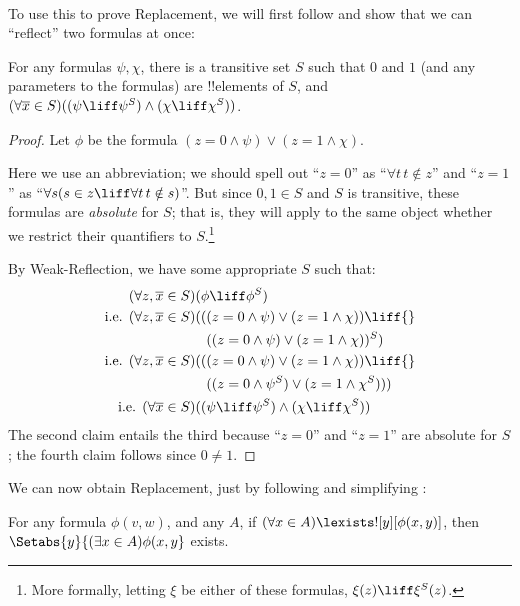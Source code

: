 \documentclass[../../../include/open-logic-section]{subfiles}
\begin{document}
\
\\
To use this to prove Replacement, we will first follow \citet[first
part of Theorem 2]{Levy1960} and show that we can ``reflect'' two
formulas at once:

\begin{lem}[in $\Z + \text{Weak-Reflection}$.]
For any formulas $\psi, \chi$, there is a transitive set $S$ such that $0$ and $1$ (and any parameters to the formulas) are !!{element}s of $S$, and $(\forall \overline{x} \in S)((\psi \liff \psi^S) \land (\chi \liff \chi^S))$.
\end{lem}

\begin{proof}
Let $\phi$ be the formula $(z = 0 \land \psi) \lor (z = 1 \land \chi)$. 

Here we use an abbreviation; we should spell out ``$z = 0$'' as
``$\forall t\, t \notin z$'' and ``$z =1$'' as ``$\forall s(s \in z
\liff \forall t\, t \notin s)$''. But since $0, 1 \in S$ and $S$ is
transitive, these formulas are \emph{absolute} for $S$; that is, they
will apply to the same object whether we restrict their quantifiers to
$S$.\footnote{More formally, letting $\xi$ be either of these
formulas, $\xi(z) \liff \xi^S(z)$.}

By Weak-Reflection, we have some appropriate $S$ such that:
\begin{align*}
	(\forall z, \overline{x} \in S)(&\phi \liff \phi^S)\\
	\text{i.e. }(\forall z, \overline{x} \in S)(&((z = 0 \land \psi) \lor (z = 1 \land \chi)) \liff {}\\
	&\phantom{(}((z = 0 \land \psi) \lor (z = 1 \land \chi))^S)\\
	\text{i.e. }(\forall z, \overline{x} \in S)(&((z = 0 \land \psi) \lor (z = 1 \land \chi))\liff {}\\
	&\phantom{(}((z = 0 \land \psi^S) \lor (z = 1 \land \chi^S)))\\
	\text{i.e. }(\forall \overline{x} \in S)(&(\psi \liff \psi^S) \land (\chi \liff \chi^S))
\end{align*}
The second claim entails the third because ``$z = 0$'' and ``$z=1$''
are absolute for $S$; the fourth claim follows since $0 \neq 1$.
\end{proof}\noindent We can now obtain Replacement, just by following and simplifying 
\citet[Theorem 6]{Levy1960}:

\begin{thm}\label{thm:replacement} 
For any formula $\phi(v,w)$, and any $A$, if $(\forall x \in A)\lexists![y][\phi(x,y)]$, then
$\Setabs{y}{(\exists x \in A)\phi(x,y}$ exists.
\end{thm}
\end{document}
